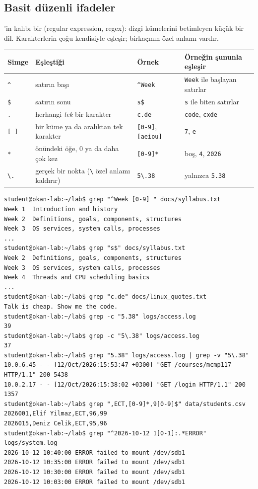\subsection{Basit düzenli ifadeler}

'in kalıbı bir  (regular expression, regex): dizgi kümelerini betimleyen küçük bir dil. Karakterlerin çoğu kendisiyle eşleşir; birkaçının özel anlamı vardır.

\begin{center}
\renewcommand{\arraystretch}{1.2}
\begin{tabular}{@{}lp{4.6cm}lp{3.6cm}@{}}
\toprule
\textbf{Simge} & \textbf{Eşleştiği} & \textbf{Örnek} & \textbf{Örneğin şununla eşleşir}\\
\midrule
\texttt{\textasciicircum} & satırın başı & \texttt{\textasciicircum Week} & \texttt{Week} ile başlayan satırlar\\
\texttt{\$} & satırın sonu & \texttt{s\$} & \texttt{s} ile biten satırlar\\
\texttt{.} & herhangi \emph{tek} bir karakter & \texttt{c.de} & \texttt{code}, \texttt{cxde}\\
\texttt{[ ]} & bir küme ya da aralıktan tek karakter & \texttt{[0-9]}, \texttt{[aeiou]} & \texttt{7}, \texttt{e}\\
\texttt{*} & önündeki öğe, $0$ ya da daha çok kez & \texttt{[0-9]*} & boş, \texttt{4}, \texttt{2026}\\
\texttt{\textbackslash.} & gerçek bir nokta (\texttt{\textbackslash} özel anlamı kaldırır) & \texttt{5\textbackslash.38} & yalnızca \texttt{5.38}\\
\bottomrule
\end{tabular}
\end{center}

\begin{lstlisting}[style=term]
student@okan-lab:~/lab$ grep "^Week [0-9] " docs/syllabus.txt
Week 1  Introduction and history
Week 2  Definitions, goals, components, structures
Week 3  OS services, system calls, processes
...
student@okan-lab:~/lab$ grep "s$" docs/syllabus.txt
Week 2  Definitions, goals, components, structures
Week 3  OS services, system calls, processes
Week 4  Threads and CPU scheduling basics
...
student@okan-lab:~/lab$ grep "c.de" docs/linux_quotes.txt
Talk is cheap. Show me the code.
student@okan-lab:~/lab$ grep -c "5.38" logs/access.log
39
student@okan-lab:~/lab$ grep -c "5\.38" logs/access.log
37
student@okan-lab:~/lab$ grep "5.38" logs/access.log | grep -v "5\.38"
10.0.6.45 - - [12/Oct/2026:15:53:47 +0300] "GET /courses/mcmp117 HTTP/1.1" 200 5438
10.0.2.17 - - [12/Oct/2026:15:38:02 +0300] "GET /login HTTP/1.1" 200 1357
student@okan-lab:~/lab$ grep ",ECT,[0-9]*,9[0-9]$" data/students.csv
2026001,Elif Yilmaz,ECT,96,99
2026015,Deniz Celik,ECT,95,96
student@okan-lab:~/lab$ grep "^2026-10-12 1[0-1]:.*ERROR" logs/system.log
2026-10-12 10:40:00 ERROR failed to mount /dev/sdb1
2026-10-12 10:35:00 ERROR failed to mount /dev/sdb1
2026-10-12 10:30:00 ERROR failed to mount /dev/sdb1
2026-10-12 10:03:00 ERROR failed to mount /dev/sdb1
\end{lstlisting}


